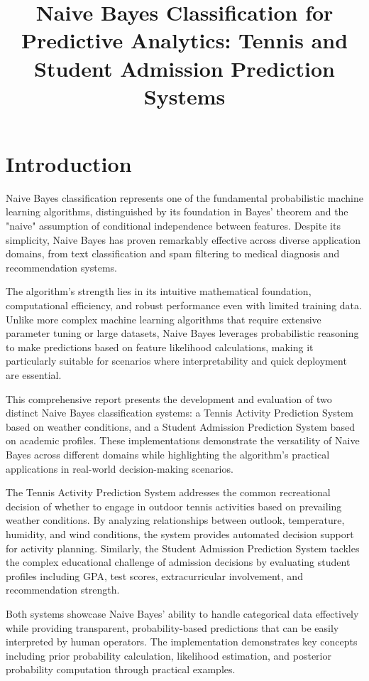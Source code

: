 \documentclass[11pt,a4paper]{article}
\title{Naive Bayes Classification for Predictive Analytics: Tennis and Student Admission Prediction Systems}
\date{}
\begin{document}
\maketitle

\section{Introduction}

Naive Bayes classification represents one of the fundamental probabilistic machine learning algorithms, distinguished by its foundation in Bayes' theorem and the "naive" assumption of conditional independence between features. Despite its simplicity, Naive Bayes has proven remarkably effective across diverse application domains, from text classification and spam filtering to medical diagnosis and recommendation systems.

The algorithm's strength lies in its intuitive mathematical foundation, computational efficiency, and robust performance even with limited training data. Unlike more complex machine learning algorithms that require extensive parameter tuning or large datasets, Naive Bayes leverages probabilistic reasoning to make predictions based on feature likelihood calculations, making it particularly suitable for scenarios where interpretability and quick deployment are essential.

This comprehensive report presents the development and evaluation of two distinct Naive Bayes classification systems: a Tennis Activity Prediction System based on weather conditions, and a Student Admission Prediction System based on academic profiles. These implementations demonstrate the versatility of Naive Bayes across different domains while highlighting the algorithm's practical applications in real-world decision-making scenarios.

The Tennis Activity Prediction System addresses the common recreational decision of whether to engage in outdoor tennis activities based on prevailing weather conditions. By analyzing relationships between outlook, temperature, humidity, and wind conditions, the system provides automated decision support for activity planning. Similarly, the Student Admission Prediction System tackles the complex educational challenge of admission decisions by evaluating student profiles including GPA, test scores, extracurricular involvement, and recommendation strength.

Both systems showcase Naive Bayes' ability to handle categorical data effectively while providing transparent, probability-based predictions that can be easily interpreted by human operators. The implementation demonstrates key concepts including prior probability calculation, likelihood estimation, and posterior probability computation through practical examples.
\end{document}
